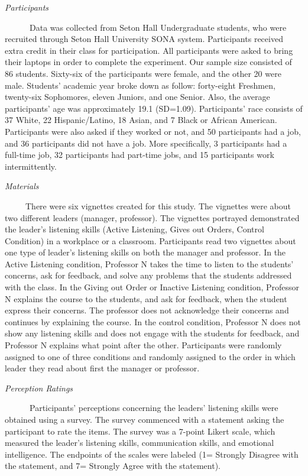 \documentclass[
  12pt,
]{article}
\begin{document}
\emph{Participants}

~~~~~~Data was collected from Seton Hall Undergraduate students, who were recruited through Seton Hall University SONA system. Participants received extra credit in their class for participation. All participants were asked to bring their laptops in order to complete the experiment. Our sample size consisted of 86 students. Sixty-six of the participants were female, and the other 20 were male. Students' academic year broke down as follow: forty-eight Freshmen, twenty-six Sophomores, eleven Juniors, and one Senior. Also, the average participants' age was approximately 19.1 (SD=1.09). Participants' race consists of 37 White, 22 Hispanic/Latino, 18 Asian, and 7 Black or African American. Participants were also asked if they worked or not, and 50 participants had a job, and 36 participants did not have a job. More specifically, 3 participants had a full-time job, 32 participants had part-time jobs, and 15 participants work intermittently.

\emph{Materials}

~~~~~There were six vignettes created for this study. The vignettes were about two different leaders (manager, professor). The vignettes portrayed demonstrated the leader's listening skills (Active Listening, Gives out Orders, Control Condition) in a workplace or a classroom. Participants read two vignettes about one type of leader's listening skills on both the manager and professor. In the Active Listening condition, Professor N takes the time to listen to the students' concerns, ask for feedback, and solve any problems that the students addressed with the class. In the Giving out Order or Inactive Listening condition, Professor N explains the course to the students, and ask for feedback, when the student express their concerns. The professor does not acknowledge their concerns and continues by explaining the course. In the control condition, Professor N does not show any listening skills and does not engage with the students for feedback, and Professor N explains what point after the other. Participants were randomly assigned to one of three conditions and randomly assigned to the order in which leader they read about first the manager or professor.

\emph{Perception Ratings}

~~~~~~Participants' perceptions concerning the leaders' listening skills were obtained using a survey. The survey commenced with a statement asking the participant to rate the items. The survey was a 7-point Likert scale, which measured the leader's listening skills, communication skills, and emotional intelligence. The endpoints of the scales were labeled (1= Strongly Disagree with the statement, and 7= Strongly Agree with the statement).
\end{document}
